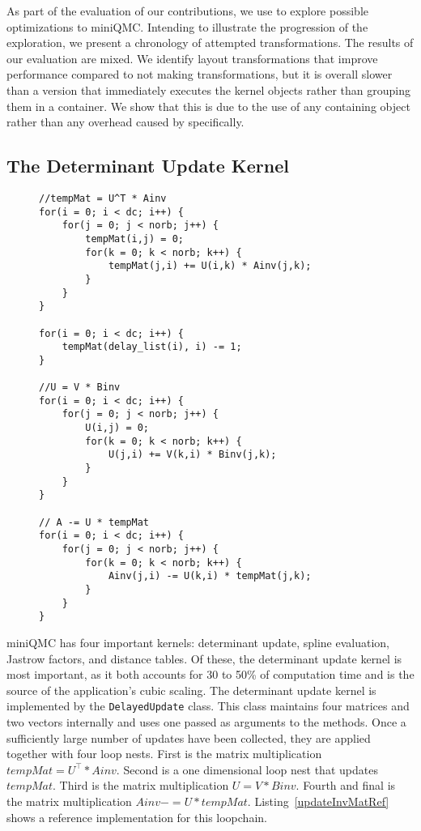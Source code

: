 As part of the evaluation of our contributions, we use \FormatDecisions{} to explore possible optimizations to miniQMC.
Intending to illustrate the progression of the exploration, we present a chronology of attempted transformations.
The results of our evaluation are mixed.
We identify layout transformations that improve performance compared to not making transformations, but it is overall slower than a version that immediately executes the kernel objects rather than grouping them in a container.
We show that this is due to the use of any containing object rather than any overhead caused by \FormatDecisions{} specifically.

\subsection{The Determinant Update Kernel}

\begin{figure}
\begin{lstlisting}[caption={Main loopchain of the determinant update kernel. Note that the access/storage order here is reversed.},label={updateInvMatRef}]
//tempMat = U^T * Ainv
for(i = 0; i < dc; i++) {
	for(j = 0; j < norb; j++) {
		tempMat(i,j) = 0;
		for(k = 0; k < norb; k++) {
			tempMat(j,i) += U(i,k) * Ainv(j,k);
		}
	}
}

for(i = 0; i < dc; i++) {
	tempMat(delay_list(i), i) -= 1;
}

//U = V * Binv
for(i = 0; i < dc; i++) {
	for(j = 0; j < norb; j++) {
		U(i,j) = 0;
		for(k = 0; k < norb; k++) {
			U(j,i) += V(k,i) * Binv(j,k);
		}
	}
}

// A -= U * tempMat
for(i = 0; i < dc; i++) {
	for(j = 0; j < norb; j++) {
		for(k = 0; k < norb; k++) {
			Ainv(j,i) -= U(k,i) * tempMat(j,k);
		}
	}
}
\end{lstlisting}
\end{figure}

miniQMC has four important kernels: determinant update, spline evaluation, Jastrow factors, and distance tables.
Of these, the determinant update kernel is most important, as it both accounts for 30 to 50\% of computation time and is the source of the application's cubic scaling.
The determinant update kernel is implemented by the \verb.DelayedUpdate. class.
This class maintains four matrices and two vectors internally and uses one passed as arguments to the methods. 
Once a sufficiently large number of updates have been collected, they are applied together with four loop nests.
First is the matrix multiplication $tempMat = U^{\top} * Ainv$.
Second is a one dimensional loop nest that updates $tempMat$.
Third is the matrix multiplication $U = V * Binv$.
Fourth and final is the matrix multiplication $Ainv -= U*tempMat$.
Listing~\ref{updateInvMatRef} shows a reference implementation for this loopchain.

